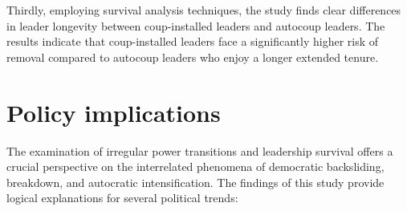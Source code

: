 \documentclass[
  12pt,
]{report}
\begin{document}
Thirdly, employing survival analysis techniques, the study finds clear
differences in leader longevity between coup-installed leaders and
autocoup leaders. The results indicate that coup-installed leaders face
a significantly higher risk of removal compared to autocoup leaders who
enjoy a longer extended tenure.

\section{Policy implications}\label{policy-implications-1}

The examination of irregular power transitions and leadership survival
offers a crucial perspective on the interrelated phenomena of democratic
backsliding, breakdown, and autocratic intensification. The findings of
this study provide logical explanations for several political trends:
\end{document}
